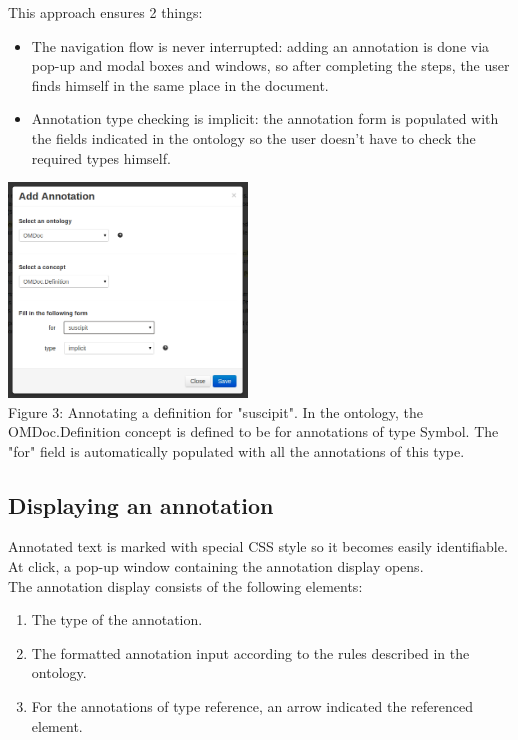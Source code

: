 \documentclass[a4paper, 12pt, notitlepage]{report}
\begin{document}
This approach ensures 2 things:

\begin{itemize}
\item The navigation flow is never interrupted: adding an annotation is done via pop-up
  and modal boxes and windows, so after completing the steps, the user finds himself in
  the same place in the document.
\item Annotation type checking is implicit: the annotation form is populated with the
  fields indicated in the ontology so the user doesn’t have to check the required types
  himself.
\end{itemize}

\begin{center}
 \includegraphics[width=2.5in]{add-definition.png}\\
 \tiny{Figure 3: Annotating a definition for "suscipit". In the ontology, the OMDoc.Definition concept is defined to be for annotations of type Symbol. The "for" field is
 automatically populated with all the annotations of this type.}
\end{center}

\subsection{Displaying an annotation}

Annotated text is marked with special CSS style so it becomes easily identifiable. At click, 
a pop-up window containing the annotation display opens.\\

The annotation display consists of the following elements:

\begin{enumerate}
\item The type of the annotation.
\item The formatted annotation input according to the rules described in the ontology.
\item For the annotations of type reference, an arrow indicated the referenced element.
\end{enumerate}
\end{document}
